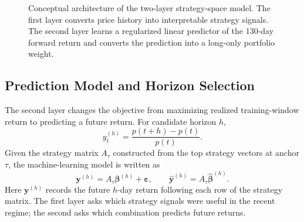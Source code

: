 \documentclass[11pt, letterpaper]{article}
\begin{document}
\begin{figure}[htbp]
\centering
{}
\caption{Conceptual architecture of the two-layer strategy-space model. The first layer converts price history into interpretable strategy signals. The second layer learns a regularized linear predictor of the 130-day forward return and converts the prediction into a long-only portfolio weight.}
\label{fig:architecture}
\end{figure}

\subsection{Prediction Model and Horizon Selection}

The second layer changes the objective from maximizing realized training-window return to predicting a future return. For candidate horizon $h$,
\[
    y_t^{(h)} = \frac{p(t+h)-p(t)}{p(t)}.
\]
Given the strategy matrix $A_\tau$ constructed from the top strategy vectors at anchor $\tau$, the machine-learning model is written as
\[
    \mathbf{y}^{(h)} = A_\tau\boldsymbol{\beta}^{(h)} + \boldsymbol{\varepsilon},
    \qquad
    \hat{\mathbf{y}}^{(h)} = A_\tau\hat{\boldsymbol{\beta}}^{(h)}.
\]
Here $\mathbf{y}^{(h)}$ records the future $h$-day return following each row of the strategy matrix. The first layer asks which strategy signals were useful in the recent regime; the second asks which combination predicts future returns.
\end{document}
